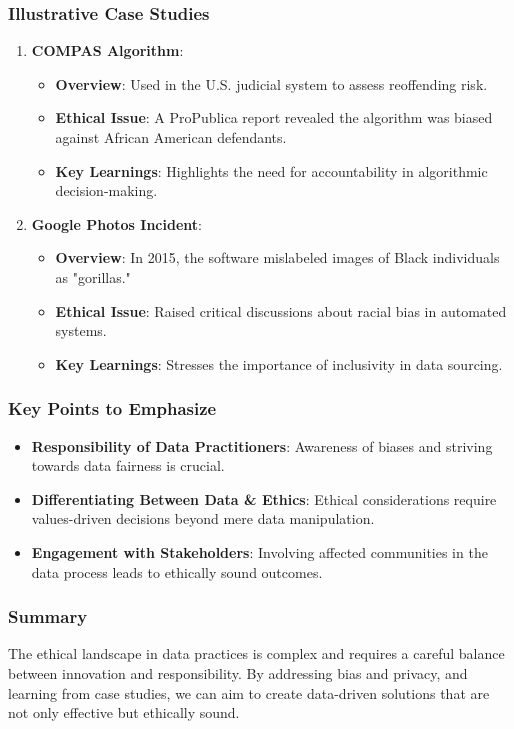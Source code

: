 \documentclass[aspectratio=169]{beamer}
\begin{document}
\begin{frame}[fragile]
    \frametitle{Illustrative Case Studies}
    \begin{enumerate}
        \item \textbf{COMPAS Algorithm}:
        \begin{itemize}
            \item \textbf{Overview}: Used in the U.S. judicial system to assess reoffending risk.
            \item \textbf{Ethical Issue}: A ProPublica report revealed the algorithm was biased against African American defendants.
            \item \textbf{Key Learnings}: Highlights the need for accountability in algorithmic decision-making.
        \end{itemize}
        
        \item \textbf{Google Photos Incident}:
        \begin{itemize}
            \item \textbf{Overview}: In 2015, the software mislabeled images of Black individuals as "gorillas."
            \item \textbf{Ethical Issue}: Raised critical discussions about racial bias in automated systems.
            \item \textbf{Key Learnings}: Stresses the importance of inclusivity in data sourcing.
        \end{itemize}
    \end{enumerate}
\end{frame}

\begin{frame}[fragile]
    \frametitle{Key Points to Emphasize}
    \begin{itemize}
        \item \textbf{Responsibility of Data Practitioners}: Awareness of biases and striving towards data fairness is crucial.
        \item \textbf{Differentiating Between Data \& Ethics}: Ethical considerations require values-driven decisions beyond mere data manipulation.
        \item \textbf{Engagement with Stakeholders}: Involving affected communities in the data process leads to ethically sound outcomes.
    \end{itemize}
\end{frame}

\begin{frame}[fragile]
    \frametitle{Summary}
    The ethical landscape in data practices is complex and requires a careful balance between innovation and responsibility. 
    By addressing bias and privacy, and learning from case studies, we can aim to create data-driven solutions that are not only effective but ethically sound.
\end{frame}
\end{document}
